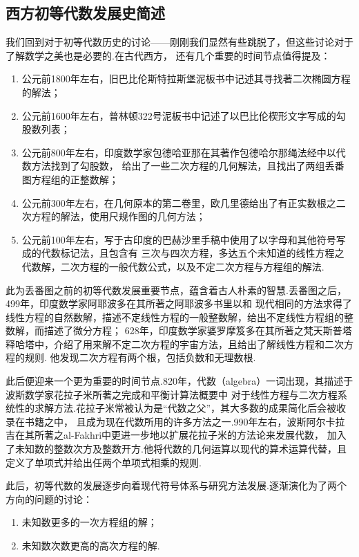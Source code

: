 \documentclass{ctexbook}
\begin{document}
\subsection{西方初等代数发展史简述}
我们回到对于初等代数历史的讨论——刚刚我们显然有些跳脱了，但这些讨论对于了解数学之美也是必要的.在古代西方，
还有几个重要的时间节点值得提及：
\begin{enumerate}
    \item 公元前1800年左右，旧巴比伦斯特拉斯堡泥板书中记述其寻找著二次椭圆方程的解法；
    \item 公元前1600年左右，普林顿322号泥板书中记述了以巴比伦楔形文字写成的勾股数列表；
    \item 公元前800年左右，印度数学家包德哈亚那在其著作包德哈尔那绳法经中以代数方法找到了勾股数，
    给出了一些二次方程的几何解法，且找出了两组丢番图方程组的正整数解；
    \item 公元前300年左右，在几何原本的第二卷里，欧几里德给出了有正实数根之二次方程的解法，使用尺规作图的几何方法；
    \item 公元前100年左右，写于古印度的巴赫沙里手稿中使用了以字母和其他符号写成的代数标记法，且包含有
    三次与四次方程，多达五个未知道的线性方程之代数解，二次方程的一般代数公式，以及不定二次方程与方程组的解法.
\end{enumerate}

此为丢番图之前的初等代数发展重要节点，蕴含着古人朴素的智慧.丢番图之后，499年，印度数学家阿耶波多在其所著之阿耶波多书里以和
现代相同的方法求得了线性方程的自然数解，描述不定线性方程的一般整数解，给出不定线性方程组的整数解，而描述了微分方程；
628年，印度数学家婆罗摩笈多在其所著之梵天斯普塔释哈塔中，介绍了用来解不定二次方程的宇宙方法，且给出了解线性方程和二次方程的规则.
他发现二次方程有两个根，包括负数和无理数根.

此后便迎来一个更为重要的时间节点.820年，代数（algebra）一词出现，其描述于波斯数学家花拉子米所著之完成和平衡计算法概要中
对于线性方程与二次方程系统性的求解方法.花拉子米常被认为是“代数之父”，其大多数的成果简化后会被收录在书籍之中，
且成为现在代数所用的许多方法之一.990年左右，波斯阿尔卡拉吉在其所著之al-Fakhri中更进一步地以扩展花拉子米的方法论来发展代数，
加入了未知数的整数次方及整数开方.他将代数的几何运算以现代的算术运算代替，且定义了单项式并给出任两个单项式相乘的规则.

此后，初等代数的发展逐步向着现代符号体系与研究方法发展.逐渐演化为了两个方向的问题的讨论：
\begin{enumerate}
    \item 未知数更多的一次方程组的解；
    \item 未知数次数更高的高次方程的解.
\end{enumerate}
\end{document}
